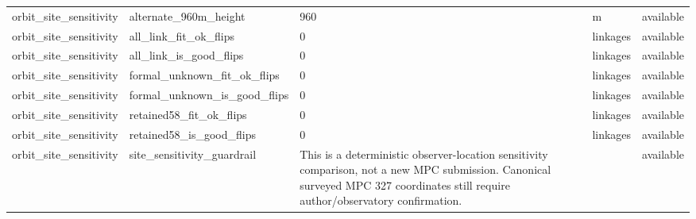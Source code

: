 \begin{tabular}{lllll}
orbit\_site\_sensitivity & alternate\_960m\_height & 960 & m & available \\
orbit\_site\_sensitivity & all\_link\_fit\_ok\_flips & 0 & linkages & available \\
orbit\_site\_sensitivity & all\_link\_is\_good\_flips & 0 & linkages & available \\
orbit\_site\_sensitivity & formal\_unknown\_fit\_ok\_flips & 0 & linkages & available \\
orbit\_site\_sensitivity & formal\_unknown\_is\_good\_flips & 0 & linkages & available \\
orbit\_site\_sensitivity & retained58\_fit\_ok\_flips & 0 & linkages & available \\
orbit\_site\_sensitivity & retained58\_is\_good\_flips & 0 & linkages & available \\
orbit\_site\_sensitivity & site\_sensitivity\_guardrail & This is a deterministic observer-location sensitivity comparison, not a new MPC submission. Canonical surveyed MPC 327 coordinates still require author/observatory confirmation. &  & available \\
\bottomrule
\end{tabular}
